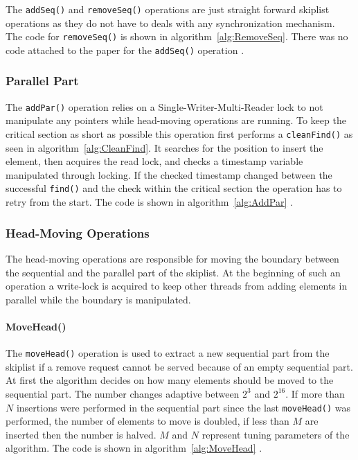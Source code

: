 The \texttt{addSeq()} and \texttt{removeSeq()} operations are just straight forward skiplist operations as they do not have to deals with any synchronization mechanism. The code for \texttt{removeSeq()} is shown in algorithm~\ref{alg:RemoveSeq}. There was no code attached to the paper for the \texttt{addSeq()} operation \cite{calciu_adaptive_2014}.

\subsubsection{Parallel Part}

The \texttt{addPar()} operation relies on a Single-Writer-Multi-Reader lock to not manipulate any pointers while head-moving operations are running. To keep the critical section as short as possible this operation first performs a \texttt{cleanFind()} as seen in algorithm~\ref{alg:CleanFind}. It searches for the position to insert the element, then acquires the read lock, and checks a timestamp variable manipulated through locking. If the checked timestamp changed between the successful \texttt{find()} and the check within the critical section the operation has to retry from the start. The code is shown in algorithm~\ref{alg:AddPar} \cite{calciu_adaptive_2014}.

\subsubsection{Head-Moving Operations}

The head-moving operations are responsible for moving the boundary between the sequential and the parallel part of the skiplist. At the beginning of such an operation a write-lock is acquired to keep other threads from adding elements in parallel while the boundary is manipulated.

\paragraph{MoveHead()}

The \texttt{moveHead()} operation is used to extract a new sequential part from the skiplist if a remove request cannot be served because of an empty sequential part. At first the algorithm decides on how many elements should be moved to the sequential part. The number changes adaptive between $2^3$ and $2^{16}$. If more than $N$ insertions were performed in the sequential part since the last \texttt{moveHead()} was performed, the number of elements to move is doubled, if less than $M$ are inserted then the number is halved. $M$ and $N$ represent tuning parameters of the algorithm. The code is shown in algorithm~\ref{alg:MoveHead} \cite{calciu_adaptive_2014}.

